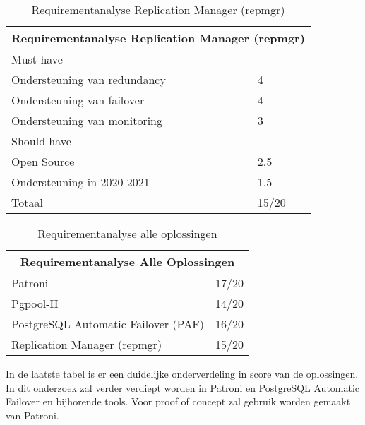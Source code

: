 \begin{table}
\begin{tabular}{ |p{6cm}||p{6cm}|  }
    \hline
    \multicolumn{2}{|c|}{Requirementanalyse Replication Manager (repmgr)} \\
    \hline
    Must have & \\
    \hline
    Ondersteuning van redundancy  & 4 \\
    Ondersteuning van failover &  4 \\
    Ondersteuning van monitoring & 3 \\
    \hline
    Should have & \\
    \hline
    Open Source &  2.5 \\
    Ondersteuning in 2020-2021 & 1.5 \\
    \hline
    \hline
    Totaal & 15/20 \\
    \hline
\end{tabular}
\caption{Requirementanalyse Replication Manager (repmgr)}
\label{table:Requirementanalyse Replication Manager (repmgr)}
\end{table}


\begin{table}
\begin{tabular}{ |p{6cm}||p{6cm}|  }
    \hline
    \multicolumn{2}{|c|}{Requirementanalyse Alle Oplossingen} \\
    \hline
    Patroni & 17/20 \\
    \hline
    Pgpool-II & 14/20 \\
    \hline
    PostgreSQL Automatic Failover (PAF) & 16/20 \\
    \hline
    Replication Manager (repmgr) & 15/20 \\
    \hline
\end{tabular}
\caption{Requirementanalyse alle oplossingen}
\label{table:Requirementanalyse alle oplossingen}
\end{table}

In de laatste tabel is er een duidelijke onderverdeling in score van de oplossingen. In dit onderzoek zal verder verdiept worden in Patroni en PostgreSQL Automatic Failover en bijhorende tools. Voor proof of concept zal gebruik worden gemaakt van Patroni.
